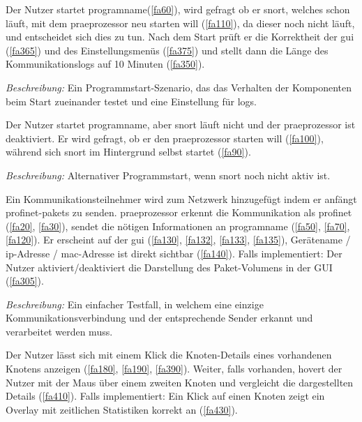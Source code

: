 \begin{description}[style=multiline, leftmargin=4cm, labelwidth=4cm]
 
   Der Nutzer startet \gls{programname}(\ref{fa60}), wird gefragt ob er \gls{snort}, welches schon läuft, mit dem \gls{praeprozessor} neu starten will (\ref{fa110}), da dieser noch nicht läuft, und entscheidet sich dies zu tun. Nach dem Start prüft er die Korrektheit der \gls{gui} (\ref{fa365}) und des Einstellungsmenüs (\ref{fa375}) und stellt dann die Länge des Kommunikationslogs auf 10 Minuten (\ref{fa350}). \par
      \textit{Beschreibung:} Ein Programmstart-Szenario, das das Verhalten der Komponenten beim Start zueinander testet und eine Einstellung für \glspl{log}.
 
   Der Nutzer startet \gls{programname}, aber \gls{snort} läuft nicht und der \gls{praeprozessor} ist deaktiviert. Er wird gefragt, ob er den \gls{praeprozessor} starten will (\ref{fa100}), während sich \gls{snort} im Hintergrund selbst startet (\ref{fa90}). \par
      \textit{Beschreibung:} Alternativer Programmstart, wenn \gls{snort} noch nicht aktiv ist.
  
   Ein Kommunikationsteilnehmer wird zum Netzwerk hinzugefügt indem er anfängt \gls{profinet}-\glspl{paket} zu senden. \gls{praeprozessor} erkennt die Kommunikation als \gls{profinet} (\ref{fa20}, \ref{fa30}), sendet die nötigen Informationen an \gls{programname} (\ref{fa50}, \ref{fa70}, \ref{fa120}). Er erscheint auf der \gls{gui} (\ref{fa130}, \ref{fa132}, \ref{fa133}, \ref{fa135}), Gerätename / \gls{ip}-Adresse / \gls{mac}-Adresse ist direkt sichtbar (\ref{fa140}). Falls implementiert: Der Nutzer aktiviert/deaktiviert die Darstellung des Paket-Volumens in der GUI (\ref{fa305}). \par
      \textit{Beschreibung:} Ein einfacher Testfall, in welchem eine einzige Kommunikationsverbindung und der entsprechende Sender erkannt und verarbeitet werden muss.
  
   Der Nutzer lässt sich mit einem Klick die Knoten-Details eines vorhandenen Knotens anzeigen (\ref{fa180}, \ref{fa190}, \ref{fa390}). Weiter, falls vorhanden, hovert der Nutzer mit der Maus über einem zweiten Knoten und vergleicht die dargestellten Details (\ref{fa410}). Falls implementiert: Ein Klick auf einen Knoten zeigt ein Overlay mit zeitlichen Statistiken korrekt an (\ref{fa430}).
  

\end{description}
